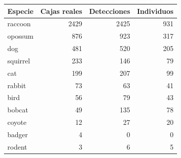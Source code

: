 \begin{tabular}{lrrr}
\hline
Especie & Cajas reales & Detecciones & Individuos \\
\hline
raccoon & 2429 & 2425 & 931 \\
opossum & 876 & 923 & 317 \\
dog & 481 & 520 & 205 \\
squirrel & 233 & 146 & 79 \\
cat & 199 & 207 & 99 \\
rabbit & 73 & 63 & 41 \\
bird & 56 & 79 & 43 \\
bobcat & 49 & 135 & 78 \\
coyote & 12 & 27 & 20 \\
badger & 4 & 0 & 0 \\
rodent & 3 & 6 & 5 \\
\hline
\end{tabular}
